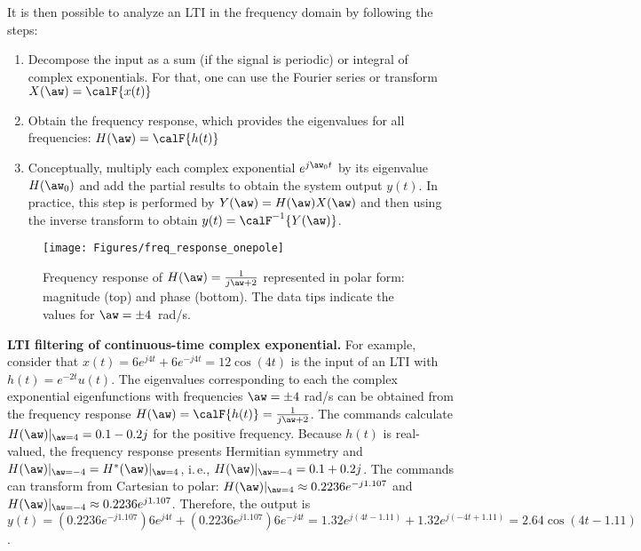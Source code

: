 It is then possible to analyze an LTI in the frequency domain by following the steps:
\begin{enumerate}
	\item Decompose the input as a sum (if the signal is periodic) or integral of complex exponentials. For that, one can use the Fourier series or transform $X(\aw) = \calF \{ x(t) \}$
	\item Obtain the frequency response, which provides the eigenvalues for all frequencies: $H(\aw) = \calF \{ h(t) \}$
	\item Conceptually, multiply each complex exponential $e^{j \aw_0 t}$ by its eigenvalue $H(\aw_0)$ and add the
	partial results to obtain the system output $y(t)$. In practice, this step is performed
	by 
	 $Y(\aw)=H(\aw) X(\aw)$ and then using the inverse transform to obtain $y(t) = \calF^{-1} \{ Y(\aw) \}$.
\end{enumerate}

\begin{figure}
\centering
\texttt{[image: Figures/freq\_response\_onepole]}
\caption[{Frequency response of $H(\aw) = \frac{1}{j \aw + 2}$ represented in polar form: magnitude (top) and phase (bottom).}]{Frequency response of $H(\aw) = \frac{1}{j \aw + 2}$ represented in polar form: magnitude (top) and phase (bottom). The data tips indicate the values for $\aw= \pm 4$~rad/s.\label{fig:freq_response_onepole}}
\end{figure}

\bExample \textbf{LTI filtering of continuous-time complex exponential.}
For example, consider that $x(t) = 6e^{j 4 t} + 6e^{-j 4 t} = 12 \cos(4t)$ is the input of an LTI with $h(t)=e^{-2t} u(t)$. The eigenvalues corresponding to each the complex exponential eigenfunctions with frequencies $\aw=\pm 4$ rad/s can be obtained from the frequency response $H(\aw) = \calF \{ h(t) \} = \frac{1}{j \aw + 2}$. The {\matlab} commands  calculate $H(\aw)|_{\aw=4}=0.1-0.2j$ for the positive frequency. 
Because $h(t)$ is real-valued, the frequency response presents Hermitian symmetry and $H(\aw)|_{\aw=-4} = H^*(\aw)|_{\aw=4}$, i.\,e., $H(\aw)|_{\aw=-4}=0.1+0.2j$. The commands  can transform from Cartesian to polar: $H(\aw)|_{\aw=4} \approx 0.2236 e^{-j1.107}$ and $H(\aw)|_{\aw=-4} \approx 0.2236 e^{j1.107}$. Therefore, the output is $y(t) = (0.2236 e^{-j1.107}) 6e^{j 4 t} + (0.2236 e^{j1.107}) 6e^{-j 4 t} = 
1.32 e^{j(4t - 1.11)} + 1.32 e^{j(-4t + 1.11)} = 2.64 \cos(4t - 1.11)$. 

